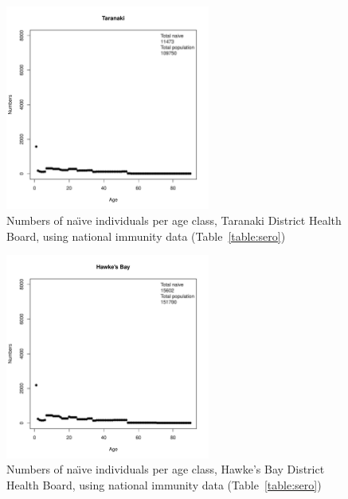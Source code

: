 \documentclass{article}
\begin{document}
\begin{figure}[H]
  \begin{center}
    \includegraphics[width=0.6\textwidth]{dhb9.pdf}
     \end{center}
     \caption{Numbers of na\"{\i}ve individuals per age class, Taranaki District Health Board, using national immunity data (Table~\autoref{table:sero})}
     \label{fig:Taranaki}
\end{figure}

\begin{figure}[H]
     \begin{center}
     \includegraphics[width=0.6\textwidth]{dhb10.pdf}
     \end{center}
     \caption{Numbers of na\"{\i}ve individuals per age class, Hawke's Bay District Health Board, using national immunity data (Table~\autoref{table:sero})}
     \label{fig:HawkesBay}
\end{figure}
\end{document}
